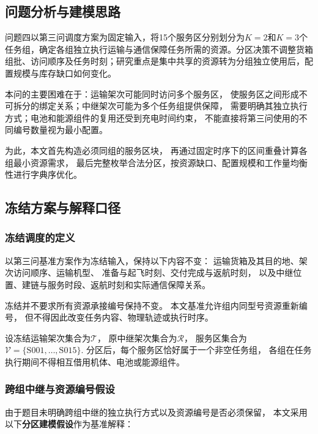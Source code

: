 \documentclass[bwprint]{gmcmthesis}
\begin{document}
\subsection{问题分析与建模思路}

问题四以第三问调度方案为固定输入，将15个服务区分别划分为$K=2$和$K=3$个任务组，确定各组独立执行运输与通信保障任务所需的资源。分区决策不调整货箱组批、访问顺序及任务时刻；研究重点是集中共享的资源转为分组独立使用后，配置规模与库存缺口如何变化。

本问的主要困难在于：运输架次可能同时访问多个服务区，
使服务区之间形成不可拆分的绑定关系；中继架次可能为多个任务组提供保障，
需要明确其独立执行方式；电池和能源组件的复用还受到充电时间约束，
不能直接将第三问使用的不同编号数量视为最小配置。

为此，本文首先构造必须同组的服务区块，
再通过固定时序下的区间重叠计算各组最小资源需求，
最后完整枚举合法分区，按资源缺口、配置规模和工作量均衡性进行字典序优化。

\subsection{冻结方案与解释口径}

\subsubsection{冻结调度的定义}

以第三问基准方案作为冻结输入，保持以下内容不变：
运输货箱及其目的地、架次访问顺序、运输机型、
准备与起飞时刻、交付完成与返航时刻，
以及中继位置、建链与服务时段、返航时刻和实际通信保障关系。

冻结并不要求所有资源承接编号保持不变。
本文基准允许组内同型号资源重新编号，
但不得因此改变任务内容、物理轨迹或执行时序。

设冻结运输架次集合为$\mathcal{T}$，
原中继架次集合为$\mathcal{R}$，
服务区集合为
\(\mathcal{V}=\{\mathrm{S001},\ldots,\mathrm{S015}\}\).
分区后，每个服务区恰好属于一个非空任务组，
各组在任务执行期间不得相互借用机体、电池或能源组件。

\subsubsection{跨组中继与资源编号假设}

由于题目未明确跨组中继的独立执行方式以及资源编号是否必须保留，
本文采用以下\textbf{分区建模假设}作为基准解释：
\end{document}
